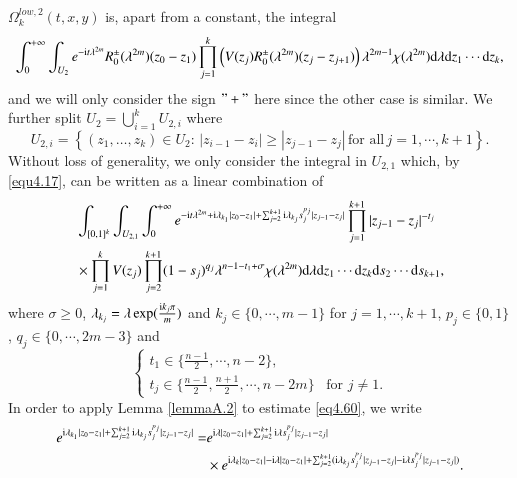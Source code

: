\documentclass[11pt,reqno]{amsart}
\def\d{{\rm d}}
\def\i{{\rm i}}
\numberwithin{equation}{section}
\theoremstyle{definition}
\begin{document}
$\Omega^{low,2}_{k}(t,x,y)$ is, apart from a constant, the integral
$$
\int_{0}^{+\infty}\int_{U_2}e^{-\i t\lambda^{2m}}R_{0}^{\pm}(\lambda^{2m})(z_{0}-z_{1})\prod_{j=1}^{k}\left(V(z_{j})R_{0}^{\pm}(\lambda^{2m})(z_{j}-z_{j+1})\right)\lambda^{2m-1}\chi(\lambda^{2m})\d\lambda \d z_{1}\cdots \d z_{k},
$$
and we will only consider the sign $"+"$ here since the other case is similar. We further split $U_2=\bigcup_{i=1}^k U_{2, i}$ where
$$U_{2, i}=\left\{(z_1,\ldots, z_k)\in U_2: \,|z_{i-1}-z_{i}|\geq|z_{j-1}-z_{j}|\,\mbox{for all}\, j=1,\cdots,k+1\right\}.$$
Without loss of generality, we only consider the integral in $ U_{2, 1}$ which, by \eqref{equ4.17}, can be written as a linear combination of
\begin{equation}\label{eq4.60}
\begin{split}
	&\int_{[0,1]^k}\int_{U_{2, 1}}\int_{0}^{+\infty}e^{-\i t\lambda^{2m}+\i\lambda_{k_{1}}|z_{0}-z_{1}|+\sum_{j=2}^{k+1}\i\lambda_{k_{j}}s_{j}^{p_{j}}|z_{j-1}-z_{j}|}\prod_{j=1}^{k+1}|z_{j-1}-z_{j}|^{-t_{j}}\\
	&\times\prod_{j=1}^{k}V(z_{j})\prod_{j=2}^{k+1}(1-s_{j})^{q_{j}}
	\lambda^{n-1-t_{1}+\sigma}\chi(\lambda^{2m})\d\lambda \d z_{1}\cdots \d z_{k}\d s_{2}\cdots\d s_{k+1},
\end{split}
\end{equation}
where $\sigma\geq 0$,  $\lambda_{k_{j}}=\lambda \exp(\frac{\i k_{j}\pi}{m})$ and $k_{j}\in\{0,\cdots,m-1\}$ for $j=1,\cdots,k+1$, $p_{j}\in\{0,1\}$, $q_{j}\in\{0,\cdots,2m-3\}$ and
\begin{equation*}
\begin{cases}
	t_{1}\in\{\frac{n-1}{2},\cdots,n-2\},\\
	t_{j}\in\{\frac{n-1}{2},\frac{n+1}{2},\cdots,n-2m\}\,\,\, \mbox{ for}\,\,  j\neq1.
\end{cases}
\end{equation*}
In order to apply Lemma \ref{lemmaA.2} to estimate \eqref{eq4.60}, we write
\begin{equation}\label{equ4.low}
\begin{split}	e^{\i\lambda_{k_{1}}|z_{0}-z_{1}|+\sum_{j=2}^{k+1}\i\lambda_{k_{j}}s_{j}^{p_{j}}|z_{j-1}-z_{j}|}=&e^{\i\lambda|z_{0}-z_{1}|+\sum_{j=2}^{k+1}\i\lambda s_{j}^{p_{j}}|z_{j-1}-z_{j}|}\\
	&\times e^{\i\lambda_{k}|z_{0}-z_{1}|-\i\lambda|z_{0}-z_{1}|+\sum_{j=2}^{k+1}
		(\i\lambda_{k_{j}}s_{j}^{p_{j}}|z_{j-1}-z_{j}|-\i\lambda s_{j}^{p_{j}}|z_{j-1}-z_{j}|)}.
\end{split}
\end{equation}
\end{document}
